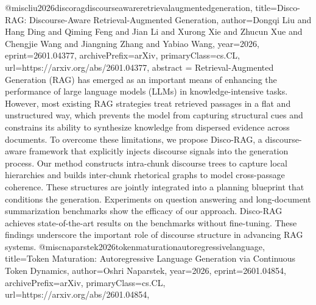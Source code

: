 {}@misc{liu2026discoragdiscourseawareretrievalaugmentedgeneration,
      title={Disco-RAG: Discourse-Aware Retrieval-Augmented Generation}, 
      author={Dongqi Liu and Hang Ding and Qiming Feng and Jian Li and Xurong Xie and Zhucun Xue and Chengjie Wang and Jiangning Zhang and Yabiao Wang},
      year={2026},
      eprint={2601.04377},
      archivePrefix={arXiv},
      primaryClass={cs.CL},
      url={https://arxiv.org/abs/2601.04377},
      abstract = {Retrieval-Augmented Generation (RAG) has emerged as an important means of enhancing the performance of large language models (LLMs) in knowledge-intensive tasks. However, most existing RAG strategies treat retrieved passages in a flat and unstructured way, which prevents the model from capturing structural cues and constrains its ability to synthesize knowledge from dispersed evidence across documents. To overcome these limitations, we propose Disco-RAG, a discourse-aware framework that explicitly injects discourse signals into the generation process. Our method constructs intra-chunk discourse trees to capture local hierarchies and builds inter-chunk rhetorical graphs to model cross-passage coherence. These structures are jointly integrated into a planning blueprint that conditions the generation. Experiments on question answering and long-document summarization benchmarks show the efficacy of our approach. Disco-RAG achieves state-of-the-art results on the benchmarks without fine-tuning. These findings underscore the important role of discourse structure in advancing RAG systems.}
}@misc{naparstek2026tokenmaturationautoregressivelanguage,
      title={Token Maturation: Autoregressive Language Generation via Continuous Token Dynamics}, 
      author={Oshri Naparstek},
      year={2026},
      eprint={2601.04854},
      archivePrefix={arXiv},
      primaryClass={cs.CL},
      url={https://arxiv.org/abs/2601.04854},
}
